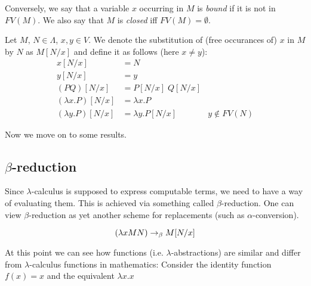 Conversely, we say that a variable $x$ occurring in $M$ is \emph{bound} if it is
not in $FV(M)$. We also say that $M$ is \emph{closed} iff $FV(M) = \emptyset$.

\begin{definition}[Substitution]
    Let $M,\, N \in \Lambda$, $x, y\in V$. We denote the
    substitution of (free occurances of) $x$ in $M$ by $N$ as $M[N/x]$ and
    define it as follows (here $x \neq y$):
    \begin{align*}
        x[N/x] &= N & \\
        y[N/x] &= y & \\
        (P Q)[N/x] &= P[N/x]\; Q[N/x] & \\
        (\lambda x. P)[N/x] &= \lambda x.P & \\
        (\lambda y. P)[N/x] &= \lambda y.P[N/x] & y \notin FV(N)
    \end{align*}
\end{definition}


Now we move on to some results.

\subsection{$\beta$-reduction}

Since $\lambda$-calculus is supposed to express computable terms, we need to
have a way of evaluating them. This is achieved via something called
$\beta$-reduction. One can view $\beta$-reduction as yet another scheme for
replacements (such as $\alpha$-conversion).

\begin{definition}
\[ (\lambda x M N) \rightarrow_\beta M[N/x] \]
\end{definition}

At this point we can see how functions (i.e. $\lambda$-abstractions) are
similar and differ from $\lambda$-calculus functions in mathematics:
Consider the identity function $f(x) = x$ and the equivalent $\lambda x. x$

